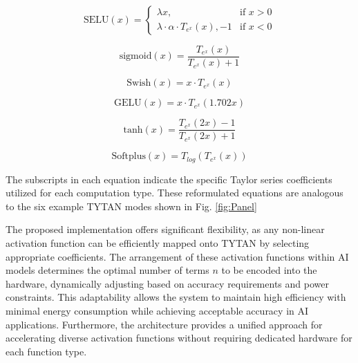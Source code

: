 \documentclass[conference,10pt]{IEEEtran}
\begin{document}
    \begin{equation}
        \text{SELU}(x) =
        \begin{cases} 
            \lambda x, & \text{if } x > 0 \\
            \lambda \cdot \alpha \cdot T_{e^x}(x),-1 & \text{if } x < 0
        \end{cases}
        \label{eq:4}
    \end{equation}
    
    \begin{equation} 
       \text{sigmoid}(x) = \frac{T_{e^x}(x)}{T_{e^x}(x) + 1}
       \label{eq:5}
    \end{equation}
    
    \begin{equation}
        \text{Swish}(x) = x \cdot T_{e^x}(x)
        \label{eq:6}
    \end{equation}
    
    \begin{equation}
        \text{GELU}(x) = x \cdot T_{e^x}(1.702x)
        \label{eq:7}
    \end{equation}
    
    \begin{equation}
        \text{tanh}(x) = \frac{T_{e^x}(2x) - 1}{T_{e^x}(2x) + 1}
        \label{eq:8}
    \end{equation}
    
    \begin{equation}
        \text{Softplus}(x) = T_{log}(T_{e^x}(x))
        \label{eq:9}
    \end{equation}
    
    The subscripts in each equation indicate the specific Taylor series coefficients utilized for each computation type. These reformulated equations are analogous to the six example TYTAN modes shown in Fig. \ref{fig:Panel}
    
    The proposed implementation offers significant flexibility, as any non-linear activation function can be efficiently mapped onto TYTAN by selecting appropriate coefficients. The arrangement of these activation functions within AI models determines the optimal number of terms $n$ to be encoded into the hardware, dynamically adjusting based on accuracy requirements and power constraints. This adaptability allows the system to maintain high efficiency with minimal energy consumption while achieving acceptable accuracy in AI applications. Furthermore, the architecture provides a unified approach for accelerating diverse activation functions without requiring dedicated hardware for each function type.
\end{document}
